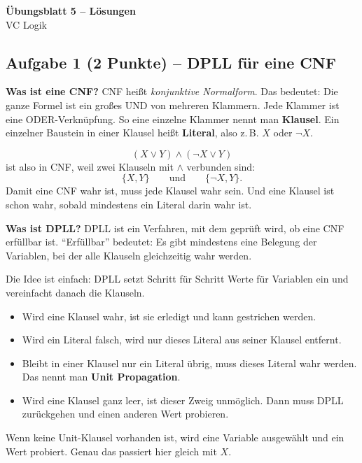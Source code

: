 \documentclass[a4paper,12pt]{article}
\begin{document}
\begin{center}
{\LARGE\bfseries \"Ubungsblatt 5 -- L\"osungen}\\[0.5em]
{\large VC Logik}
\end{center}

\bigskip

\subsection*{Aufgabe 1 \textnormal{(2 Punkte)} -- DPLL f\"ur eine CNF}

\textbf{Was ist eine CNF?}
CNF hei\ss t \emph{konjunktive Normalform}. Das bedeutet: Die ganze Formel
ist ein gro\ss es UND von mehreren Klammern. Jede Klammer ist eine ODER-Verkn\"upfung.
So eine einzelne Klammer nennt man \textbf{Klausel}. Ein einzelner Baustein
in einer Klausel hei\ss t \textbf{Literal}, also z.\,B. $X$ oder $\neg X$.

\[
(X \vee Y) \wedge (\neg X \vee Y)
\]
ist also in CNF, weil zwei Klauseln mit $\wedge$ verbunden sind:
\[
\{X,Y\}
\qquad\text{und}\qquad
\{\neg X,Y\}.
\]
Damit eine CNF wahr ist, muss jede Klausel wahr sein. Und eine Klausel ist
schon wahr, sobald mindestens ein Literal darin wahr ist.

\medskip
\textbf{Was ist DPLL?}
DPLL ist ein Verfahren, mit dem gepr\"uft wird, ob eine CNF erf\"ullbar ist.
``Erf\"ullbar'' bedeutet: Es gibt mindestens eine Belegung der Variablen,
bei der alle Klauseln gleichzeitig wahr werden.

Die Idee ist einfach: DPLL setzt Schritt f\"ur Schritt Werte f\"ur Variablen
ein und vereinfacht danach die Klauseln.
\begin{itemize}[nosep]
\item Wird eine Klausel wahr, ist sie erledigt und kann gestrichen werden.
\item Wird ein Literal falsch, wird nur dieses Literal aus seiner Klausel entfernt.
\item Bleibt in einer Klausel nur ein Literal \"ubrig, muss dieses Literal wahr werden.
      Das nennt man \textbf{Unit Propagation}.
\item Wird eine Klausel ganz leer, ist dieser Zweig unm\"oglich. Dann muss
      DPLL zur\"uckgehen und einen anderen Wert probieren.
\end{itemize}
Wenn keine Unit-Klausel vorhanden ist, wird eine Variable ausgew\"ahlt und
ein Wert probiert. Genau das passiert hier gleich mit $X$.
\end{document}
